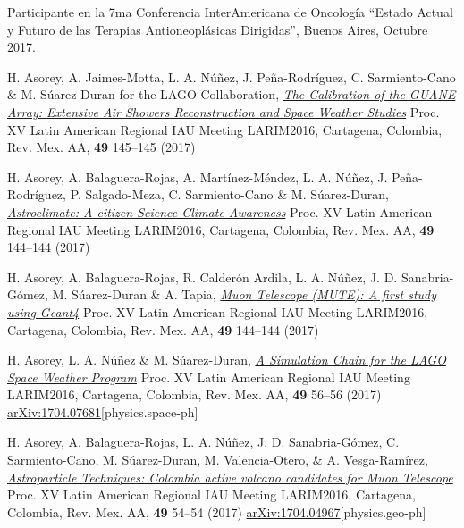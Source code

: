 \begin{etaremune}
\item {} Participante en la 7ma Conferencia InterAmericana de Oncología ``Estado Actual y Futuro de las Terapias Antioneoplásicas Dirigidas'', Buenos Aires, Octubre 2017. 

\item {} H. Asorey, A. Jaimes-Motta, L. A. Núñez, J. Peña-Rodríguez, C. Sarmiento-Cano \& M. Súarez-Duran for the LAGO Collaboration, \href{http://www.astroscu.unam.mx/rmaa/RMxAC..49/PDF/RMxAC..49\_poster3.pdf}{\emph{The Calibration of the GUANE Array: Extensive Air Showers Reconstruction and Space Weather Studies}} \en Proc. XV Latin American Regional IAU Meeting LARIM2016, Cartagena, Colombia, Rev. Mex. AA, {\bf{49}} 145--145 (2017)

\item {} H. Asorey, A. Balaguera-Rojas, A. Martínez-Méndez, L. A. Núñez, J. Peña-Rodríguez, P. Salgado-Meza, C. Sarmiento-Cano \& M. Súarez-Duran, \href{http://www.astroscu.unam.mx/rmaa/RMxAC..49/PDF/RMxAC..49\_poster2.pdf}{\emph{Astroclimate: A citizen Science Climate Awareness}} \en Proc. XV Latin American Regional IAU Meeting LARIM2016, Cartagena, Colombia, Rev. Mex. AA, {\bf{49}} 144--144 (2017)

\item {} H. Asorey, A. Balaguera-Rojas, R. Calderón Ardila, L. A. Núñez, J. D. Sanabria-Gómez, M. Súarez-Duran \& A. Tapia, \href{http://www.astroscu.unam.mx/rmaa/RMxAC..49/PDF/RMxAC..49\_poster2.pdf}{\emph{Muon Telescope (MUTE): A first study using Geant4}} \en Proc. XV Latin American Regional IAU Meeting LARIM2016, Cartagena, Colombia, Rev. Mex. AA, {\bf{49}} 144--144 (2017)

\item {} H. Asorey, L. A. Núñez \& M. Súarez-Duran, \href{http://www.astroscu.unam.mx/rmaa/RMxAC..49/PDF/RMxAC..49\_oral6.pdf}{\emph{A Simulation Chain for the LAGO Space Weather Program}} \en Proc. XV Latin American Regional IAU Meeting LARIM2016, Cartagena, Colombia, Rev. Mex. AA, {\bf{49}} 56--56 (2017) \href{http://arxiv.org/abs/1704.07681}{arXiv:1704.07681}[physics.space-ph]

\item {} H. Asorey, A. Balaguera-Rojas, L. A. Núñez, J. D. Sanabria-Gómez, C. Sarmiento-Cano, M. Súarez-Duran, M. Valencia-Otero, \& A. Vesga-Ramírez, \href{http://www.astroscu.unam.mx/rmaa/RMxAC..49/PDF/RMxAC..49\_oral4.pdf}{\emph{Astroparticle Techniques: Colombia active volcano candidates for Muon Telescope}} \en Proc. XV Latin American Regional IAU Meeting LARIM2016, Cartagena, Colombia, Rev. Mex. AA, {\bf{49}} 54--54 (2017) \href{http://arxiv.org/abs/1704.04967}{arXiv:1704.04967}[physics.geo-ph]


\end{etaremune}
